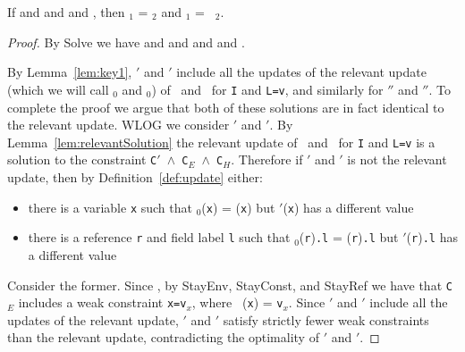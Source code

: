 \begin{Lemma}
\label{lem:phase1Det}
If \emph{} and
\emph{} and 
\emph{}
and
\emph{},
then {\tt \Euid$_1$} = {\tt \Euid$_2$} and {\tt \Huid$_1$} = {\tt
  \Huid$_2$}.
\end{Lemma}
\begin{proof}
By {\sc Solve} we have  and
     and
and  and
.  

By
Lemma~\ref{lem:key1}, {\tt \Euid$'$} and {\tt \Huid$'$} include all
the updates of the relevant update (which we will call {\tt \Euid$_0$}
and {\tt \Huid$_0$}) of \Euid\ and \Huid\ for {\tt I} and {\tt L=v}, and similarly for {\tt \Euid$''$}
and {\tt \Huid$''$}.  To complete the proof we argue that both of
these solutions are in fact identical to the relevant update.  WLOG we
consider {\tt \Euid$'$} and {\tt \Huid$'$}.  By Lemma~\ref{lem:relevantSolution} the relevant
update of \Euid\ and \Huid\ for {\tt I} and {\tt L=v} is a solution to
the constraint {\tt C$'$ $\wedge$ C$_{E}$ $\wedge$ C$_{H}$}.
Therefore if {\tt \Euid$'$} and {\tt \Huid$'$} is not the relevant
update, then by Definition~\ref{def:update} either:
\begin{itemize}
\item there is a variable {\tt x} such that {\tt \Euid$_0$}({\tt x}) =
  {\tt \Euid}({\tt x}) but {\tt \Euid$'$}({\tt x}) has a different
  value
\item there is a reference {\tt r} and field label {\tt l} such that
  {\tt \Huid$_0$}({\tt r}){\tt .l} =
  {\tt \Huid}({\tt r}){\tt .l} but {\tt \Huid$'$}({\tt r}){\tt .l} has a different
  value
\end{itemize}
Consider the former.  
Since  ,
    by {\sc StayEnv}, {\sc StayConst}, and {\sc StayRef} we have that
    {\tt C$_E$} includes a weak constraint {\tt x=v$_x$}, where {\tt
      \Euid}({\tt x}) = {\tt v$_x$}.  Since {\tt \Euid$'$} and {\tt \Huid$'$} include all
the updates of the relevant update, {\tt \Euid$'$} and {\tt \Huid$'$}
satisfy strictly fewer weak constraints than the relevant update,
contradicting the optimality of {\tt \Euid$'$} and {\tt \Huid$'$}.


\end{proof}
